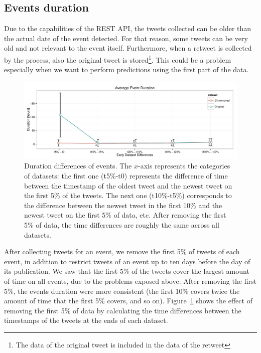 \subsection{Events duration}\label{sub:dur}

Due to the capabilities of the REST API, the tweets collected can be older than
the actual date of the event detected. 
%
For that reason, some tweets can be very old and not relevant to the event
itself. 
%
Furthermore, when a retweet is collected by the process, also the original tweet
is stored\footnote{The data of the original tweet is included in the data of the
retweet}. 
%
This could be a problem especially when we want to perform predictions using the
first part of the data. 

\begin{figure}
\centering
\includegraphics[width=\textwidth]{figures/data/duration-differences.pdf}
\caption[Duration differences of events.]{Duration differences of events. The
  $x$-axis represents the categories of datasets: the first one (t5\%-t0)
  represents the difference of time between the timestamp of the oldest tweet
  and the newest tweet on the first 5\% of the tweets. The next one (t10\%-t5\%)
  corresponds to the difference between the newest tweet in the first 10\% and
  the newest tweet on the first 5\% of data, etc. After removing the first 5\%
  of data, the time differences are roughly the same across all
  datasets.}\label{fig:duration-differences}

\end{figure}

After collecting tweets for an event, we remove the first 5\% of tweets of each
event, in addition to restrict tweets of an event up to ten days before the day
of its publication. 
%
We saw that the first 5\% of the tweets cover the largest amount of time on all
events, due to the problems exposed above. 
%
After removing the first 5\%, the events duration were more consistent (the
first 10\% covers twice the amount of time that the first 5\% covers, and so
on). 
%
Figure~\ref{fig:duration-differences} shows the effect of removing the first 5\%
of data by calculating the time differences between the timestamps of the tweets
at the ends of each dataset.


